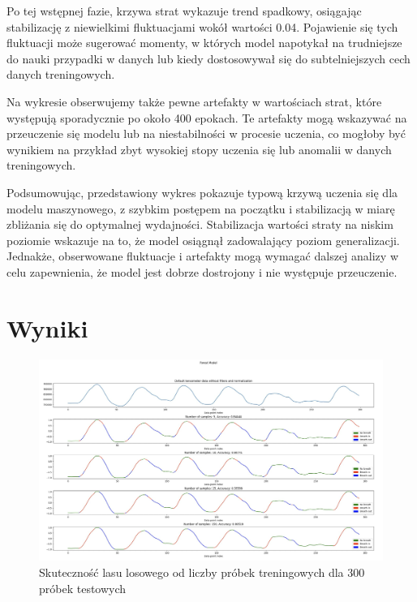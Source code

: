 \documentclass{article}
\begin{document}
Po tej wstępnej fazie, krzywa strat wykazuje trend spadkowy, osiągając stabilizację z niewielkimi fluktuacjami wokół wartości 0.04. Pojawienie się tych fluktuacji może sugerować momenty, w których model napotykał na trudniejsze do nauki przypadki w danych lub kiedy dostosowywał się do subtelniejszych cech danych treningowych.

Na wykresie obserwujemy także pewne artefakty w wartościach strat, które występują sporadycznie po około 400 epokach. Te artefakty mogą wskazywać na przeuczenie się modelu lub na niestabilności w procesie uczenia, co mogłoby być wynikiem na przykład zbyt wysokiej stopy uczenia się lub anomalii w danych treningowych.

Podsumowując, przedstawiony wykres pokazuje typową krzywą uczenia się dla modelu maszynowego, z szybkim postępem na początku i stabilizacją w miarę zbliżania się do optymalnej wydajności. Stabilizacja wartości straty na niskim poziomie wskazuje na to, że model osiągnął zadowalający poziom generalizacji. Jednakże, obserwowane fluktuacje i artefakty mogą wymagać dalszej analizy w celu zapewnienia, że model jest dobrze dostrojony i nie występuje przeuczenie.


\section{Wyniki}

\begin{figure}[H]
    \centering
    \includegraphics[width=\textwidth]{jak_sobie_radzi_las_losowy.png}
    \caption{Skuteczność lasu losowego od liczby próbek treningowych dla 300 próbek testowych}
    \label{fig:data_chart3}
\end{figure}
\end{document}
